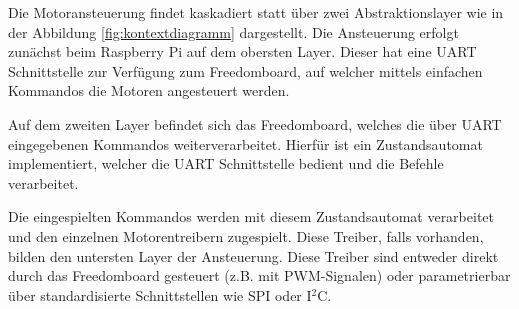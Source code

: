 Die Motoransteuerung findet kaskadiert statt über zwei Abstraktionslayer
wie in der Abbildung \ref{fig:kontextdiagramm} dargestellt. Die Ansteuerung
erfolgt zunächst beim Raspberry Pi auf dem obersten Layer. Dieser hat eine
UART Schnittstelle zur Verfügung zum Freedomboard, auf welcher mittels
einfachen Kommandos die Motoren angesteuert werden. 

Auf dem zweiten Layer befindet sich das Freedomboard, welches die über UART
eingegebenen Kommandos weiterverarbeitet. Hierfür ist ein Zustandsautomat
implementiert, welcher die UART Schnittstelle bedient und die Befehle
verarbeitet.

Die eingespielten Kommandos werden mit diesem Zustandsautomat verarbeitet und
den einzelnen Motorentreibern zugespielt. Diese Treiber, falls vorhanden,
bilden den untersten Layer der Ansteuerung. Diese Treiber sind entweder
direkt durch das Freedomboard gesteuert (z.B. mit PWM-Signalen) oder 
parametrierbar über standardisierte Schnittstellen wie SPI oder I$^2$C.

